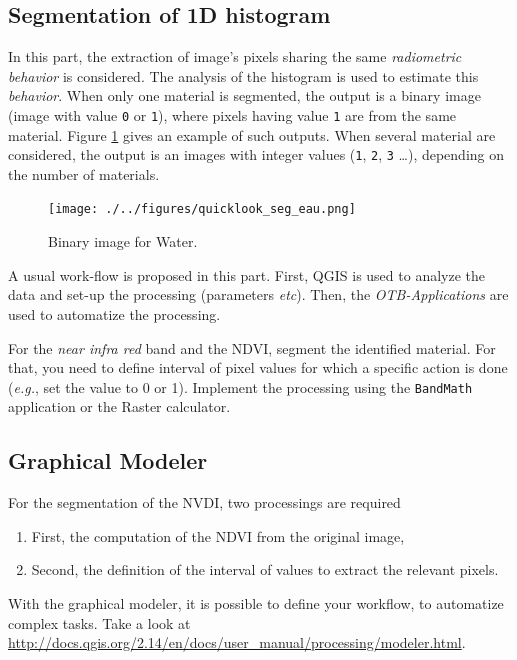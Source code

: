 \documentclass[a4paper,11pt,DIV=18]{scrartcl}
\begin{document}
\subsection{Segmentation of 1D histogram}
\label{sec:org9f658fe}
In  this part,  the  extraction  of image's  pixels  sharing the  same
\emph{radiometric behavior} is considered.  The  analysis of the histogram is
used to estimate this \emph{behavior}.   When only one material is segmented,
the output is a  binary image (image with value \texttt{0}  or \texttt{1}), where pixels
having  value \texttt{1}  are from  the same  material.  Figure  \ref{fig:org6b49686}
gives  an  example  of  such   outputs.   When  several  material  are
considered, the output is an images with integer values (\texttt{1}, \texttt{2}, \texttt{3} \ldots{}),
depending on the number of materials.

\begin{figure}[htbp]
\centering
\texttt{[image: ./../figures/quicklook\_seg\_eau.png]}
\caption{\label{fig:org6b49686}
Binary image for Water.}
\end{figure}

A usual  work-flow is proposed  in this part.  First, QGIS is  used to
analyze the data and set-up the processing (parameters \emph{etc}). Then, the
\emph{OTB-Applications} are used to automatize the processing.

\begin{work}
For  the \emph{near  infra red}  band and  the NDVI,  segment the  identified
material. For  that, you need to  define interval of pixel  values for
which a  specific action  is done  (\emph{e.g.}, set  the value  to 0  or 1).
Implement the processing using the  \texttt{BandMath} application or the Raster
calculator.
\end{work}
\subsection{Graphical Modeler}
\label{sec:org8e279ed}
For the segmentation of the NVDI, two processings are required
\begin{enumerate}
\item First, the computation of the NDVI from the original image,
\item Second,  the definition of  the interval  of values to  extract the
relevant pixels.
\end{enumerate}
With the graphical modeler, it is possible to define your workflow, to
automatize      complex      tasks.      Take      a      look      at
\url{http://docs.qgis.org/2.14/en/docs/user\_manual/processing/modeler.html}.  
\end{document}
